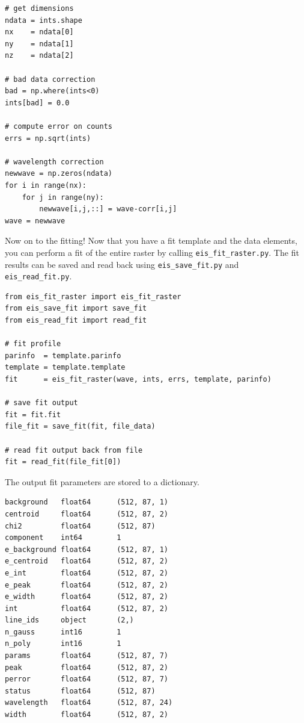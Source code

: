 \begin{lstlisting}
# get dimensions
ndata = ints.shape
nx    = ndata[0]
ny    = ndata[1]
nz    = ndata[2]

# bad data correction
bad = np.where(ints<0)
ints[bad] = 0.0

# compute error on counts
errs = np.sqrt(ints)

# wavelength correction
newwave = np.zeros(ndata)
for i in range(nx):
    for j in range(ny):
        newwave[i,j,::] = wave-corr[i,j]
wave = newwave
\end{lstlisting}

Now on to the fitting! Now that you have a fit template and the data elements, you can perform a fit of the entire raster by calling \verb+eis_fit_raster.py+. The fit results can be saved and read back using \verb+eis_save_fit.py+ and \verb+eis_read_fit.py+.

\begin{lstlisting}
from eis_fit_raster import eis_fit_raster
from eis_save_fit import save_fit
from eis_read_fit import read_fit

# fit profile
parinfo  = template.parinfo
template = template.template
fit      = eis_fit_raster(wave, ints, errs, template, parinfo)

# save fit output
fit = fit.fit
file_fit = save_fit(fit, file_data)

# read fit output back from file
fit = read_fit(file_fit[0])
\end{lstlisting}

The output fit parameters are stored to a dictionary.

\begin{lstlisting}
background   float64      (512, 87, 1)
centroid     float64      (512, 87, 2)
chi2         float64      (512, 87)
component    int64        1
e_background float64      (512, 87, 1)
e_centroid   float64      (512, 87, 2)
e_int        float64      (512, 87, 2)
e_peak       float64      (512, 87, 2)
e_width      float64      (512, 87, 2)
int          float64      (512, 87, 2)
line_ids     object       (2,)
n_gauss      int16        1
n_poly       int16        1
params       float64      (512, 87, 7)
peak         float64      (512, 87, 2)
perror       float64      (512, 87, 7)
status       float64      (512, 87)
wavelength   float64      (512, 87, 24)
width        float64      (512, 87, 2)
\end{lstlisting}

